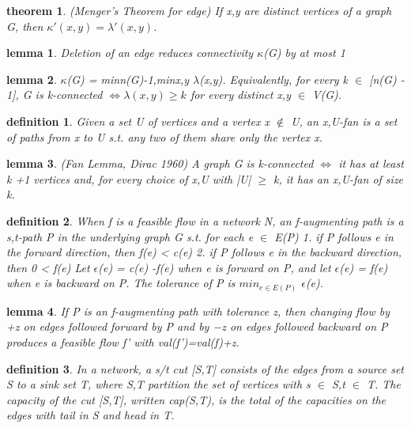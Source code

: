 \documentclass[twocolumn]{article}
\newtheorem{theorem}{theorem}[section]  %
\newtheorem{definition}{definition}
\newtheorem{lemma}{lemma}
\begin{document}
\begin{CJK*}{UTF8}{bkai}
    \begin{theorem}{(Menger’s Theorem for edge)}
         If x,y are distinct vertices of a graph G, then $\kappa'(x,y) = \lambda'(x,y)$.
    \end{theorem}

    \begin{lemma}
         Deletion of an edge reduces connectivity $\kappa$(G) by at most 1
    \end{lemma}

    \begin{lemma}
        $\kappa$(G) = min{n(G)-1,minx,y $\lambda$(x,y)}. Equivalently, for every k $\in$ [n(G) - 1],
 G is k-connected $\iff \lambda(x,y) \geq k$ for every distinct x,y $\in$ V(G).
    \end{lemma}

    \begin{definition}
        Given a set U of vertices and a vertex x $\notin $ U, an x,U-fan is a set of paths from
 x to U s.t. any two of them share only the vertex x.
    \end{definition}

    \begin{lemma}{(Fan Lemma, Dirac 1960)}
        A graph G is k-connected $\iff$ it has at least k +1 vertices and, for every choice
 of x,U with |U| $\geq$ k, it has an x,U-fan of size k.
    \end{lemma}

    \begin{definition}
        When f is a feasible flow in a network N, an f-augmenting path is a s,t-path
 P in the underlying graph G s.t. for each e $\in$ E(P)
 1. if P follows e in the forward direction, then f(e) < c(e)
 2. if P follows e in the backward direction, then 0 < f(e)
 Let $\epsilon$(e) = c(e) -f(e) when e is forward on P, and let $\epsilon$(e) = f(e) when e is
 backward on P. The tolerance of P is $min_{e \in E(P)}$ $\epsilon$(e). 
    \end{definition}

    \begin{lemma}
         If P is an f-augmenting path with tolerance z, then changing flow by +z on
 edges followed forward by P and by −z on edges followed backward on P
 produces a feasible flow f' with val(f')=val(f)+z.
    \end{lemma}

    \begin{definition}
        In a network, a s/t cut [S,T] consists of the edges from a source set S to a
 sink set T, where S,T partition the set of vertices with s $\in$ S,t $\in$ T. The
 capacity of the cut [S,T], written cap(S,T), is the total of the capacities on
 the edges with tail in S and head in T. 
    \end{definition}


\end{CJK*}
\end{document}
